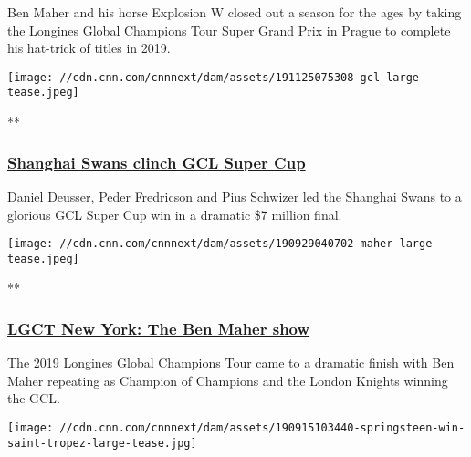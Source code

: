 Ben Maher and his horse Explosion W closed out a season for the ages by
taking the Longines Global Champions Tour Super Grand Prix in Prague to
complete his hat-trick of titles in 2019.

\href{/videos/sports/2019/11/25/shanghai-swans-deusser-fredricson-schwizer-gcl-super-cup-prague-cnneq-vision-spt-intl.cnn}{}

\texttt{[image: //cdn.cnn.com/cnnnext/dam/assets/191125075308-gcl-large-tease.jpeg]}

**

\hypertarget{shanghai-swans-clinch-gcl-super-cup}{%
\subsubsection{\texorpdfstring{\href{/videos/sports/2019/11/25/shanghai-swans-deusser-fredricson-schwizer-gcl-super-cup-prague-cnneq-vision-spt-intl.cnn}{Shanghai
Swans clinch GCL Super
Cup}}{Shanghai Swans clinch GCL Super Cup}}\label{shanghai-swans-clinch-gcl-super-cup}}

Daniel Deusser, Peder Fredricson and Pius Schwizer led the Shanghai
Swans to a glorious GCL Super Cup win in a dramatic \$7 million final.

\href{/videos/sports/2019/09/30/new-york-longines-global-champions-tour-gcl-review-ben-maher-london-knights-cnneq-vision-spt-intl.cnn}{}

\texttt{[image: //cdn.cnn.com/cnnnext/dam/assets/190929040702-maher-large-tease.jpeg]}

**

\hypertarget{lgct-new-york-the-ben-maher-show}{%
\subsubsection{\texorpdfstring{\href{/videos/sports/2019/09/30/new-york-longines-global-champions-tour-gcl-review-ben-maher-london-knights-cnneq-vision-spt-intl.cnn}{LGCT
New York: The Ben Maher
show}}{LGCT New York: The Ben Maher show}}\label{lgct-new-york-the-ben-maher-show}}

The 2019 Longines Global Champions Tour came to a dramatic finish with
Ben Maher repeating as Champion of Champions and the London Knights
winning the GCL.

\href{/videos/sports/2019/09/16/st-tropez-global-champions-tour-review-gcl-jessica-springsteen-cnneq-vision-spt-intl.cnn}{}

\texttt{[image: //cdn.cnn.com/cnnnext/dam/assets/190915103440-springsteen-win-saint-tropez-large-tease.jpg]}


